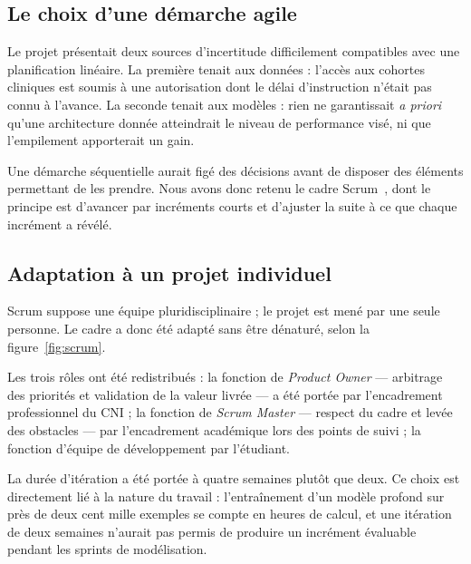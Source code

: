 \subsection{Le choix d'une démarche agile}

Le projet présentait deux sources d'incertitude difficilement compatibles avec une
planification linéaire. La première tenait aux données : l'accès aux cohortes
cliniques est soumis à une autorisation dont le délai d'instruction n'était pas connu
à l'avance. La seconde tenait aux modèles : rien ne garantissait \emph{a priori}
qu'une architecture donnée atteindrait le niveau de performance visé, ni que
l'empilement apporterait un gain.

Une démarche séquentielle aurait figé des décisions avant de disposer des éléments
permettant de les prendre. Nous avons donc retenu le cadre
Scrum~\cite{schwaber2020}, dont le principe est d'avancer par incréments courts et
d'ajuster la suite à ce que chaque incrément a révélé.

\subsection{Adaptation à un projet individuel}

Scrum suppose une équipe pluridisciplinaire ; le projet est mené par une seule
personne. Le cadre a donc été adapté sans être dénaturé, selon la
figure~\ref{fig:scrum}.

Les trois rôles ont été redistribués : la fonction de \emph{Product Owner} — arbitrage
des priorités et validation de la valeur livrée — a été portée par l'encadrement
professionnel du CNI ; la fonction de \emph{Scrum Master} — respect du cadre et levée
des obstacles — par l'encadrement académique lors des points de suivi ; la fonction
d'équipe de développement par l'étudiant.

La durée d'itération a été portée à quatre semaines plutôt que deux. Ce choix est
directement lié à la nature du travail : l'entraînement d'un modèle profond sur près
de deux cent mille exemples se compte en heures de calcul, et une itération de deux
semaines n'aurait pas permis de produire un incrément évaluable pendant les sprints
de modélisation.

